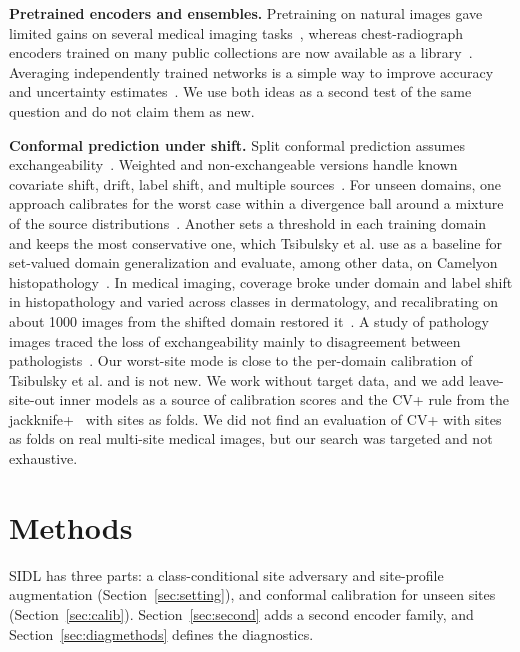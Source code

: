\documentclass[journal]{IEEEtran}
\begin{document}
\textbf{Pretrained encoders and ensembles.} Pretraining on natural images gave limited gains on several medical imaging tasks~\cite{raghu2019transfusion}, whereas chest-radiograph encoders trained on many public collections are now available as a library~\cite{cohen2022torchxrayvision}. Averaging independently trained networks is a simple way to improve accuracy and uncertainty estimates~\cite{lakshminarayanan2017simple}. We use both ideas as a second test of the same question and do not claim them as new.

\textbf{Conformal prediction under shift.} Split conformal prediction assumes exchangeability~\cite{vovk2005algorithmic,angelopoulos2023gentle}. Weighted and non-exchangeable versions handle known covariate shift, drift, label shift, and multiple sources~\cite{tibshirani2019conformal,barber2023conformal,podkopaev2021distribution,liu2024multisource}. For unseen domains, one approach calibrates for the worst case within a divergence ball around a mixture of the source distributions~\cite{zou2024coverage}. Another sets a threshold in each training domain and keeps the most conservative one, which Tsibulsky et al. use as a baseline for set-valued domain generalization and evaluate, among other data, on Camelyon histopathology~\cite{tsibulsky2025set}. In medical imaging, coverage broke under domain and label shift in histopathology and varied across classes in dermatology, and recalibrating on about 1000 images from the shifted domain restored it~\cite{mehrtens2025pitfalls}. A study of pathology images traced the loss of exchangeability mainly to disagreement between pathologists~\cite{boman2026conformal}. Our worst-site mode is close to the per-domain calibration of Tsibulsky et al. and is not new. We work without target data, and we add leave-site-out inner models as a source of calibration scores and the CV+ rule from the jackknife+~\cite{barber2021predictive} with sites as folds. We did not find an evaluation of CV+ with sites as folds on real multi-site medical images, but our search was targeted and not exhaustive.

\section{Methods}\label{sec:methods}
SIDL has three parts: a class-conditional site adversary and site-profile augmentation (Section~\ref{sec:setting}), and conformal calibration for unseen sites (Section~\ref{sec:calib}). Section~\ref{sec:second} adds a second encoder family, and Section~\ref{sec:diagmethods} defines the diagnostics.
\end{document}
